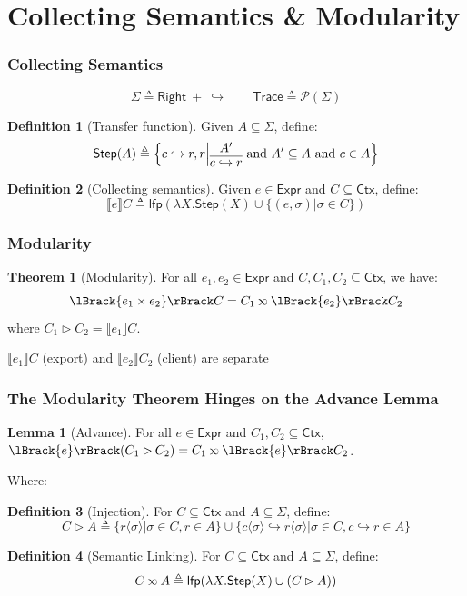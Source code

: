 \documentclass{beamer}
\theoremstyle{definition}
\newtheorem*{definition*}{Definition}
\newtheorem*{lemma*}{Lemma}
\newtheorem*{theorem*}{Theorem}
\newcommand*{\pset}{\mathcal{P}}
\newcommand*{\Expr}{\mathsf{Expr}}
\newcommand*{\ctx}{\sigma}
\newcommand*{\Ctx}{\mathsf{Ctx}}
\newcommand*{\Trace}{\mathsf{Trace}}
\newcommand*{\config}{c}
\newcommand*{\Right}{\mathsf{Right}}
\newcommand*{\rightst}{r}
\newcommand*{\lfp}{\mathsf{lfp}}
\newcommand*{\Step}{\mathsf{Step}}
\newcommand*{\semarrow}{\hookrightarrow}
\newcommand*{\semlink}{\mathbin{\rotatebox[origin=c]{180}{$\propto$}}}
\newcommand*{\link}[2]{{#1}\rtimes{#2}}
\newcommand*{\sembracket}[1]{\lBrack{#1}\rBrack}
\newcommand*{\inject}[2]{{#2}\langle{#1}\rangle}
\begin{document}
\section{Collecting Semantics \& Modularity}
\begin{frame}[c]
  \frametitle{Collecting Semantics}
  \[\Sigma\triangleq\Right\:+\:\semarrow\qquad\Trace\triangleq\pset(\Sigma)\]
  \begin{definition*}[Transfer function]
    Given $A\subseteq\Sigma$, define:
    \[
      \mathsf{Step}(A)\triangleq
      \left\{\config\semarrow\rightst, \rightst\middle|
      \begin{prooftree}[center=true]
        \hypo{A'}\infer1{\config\semarrow\rightst}
      \end{prooftree}\text{ and }
      A'\subseteq A\text{ and }\config\in A
      \right\}
    \]
  \end{definition*}
  \begin{definition*}[Collecting semantics]
    Given $e\in\Expr$ and $C\subseteq\Ctx$, define:
    \[
      \sembracket{e}C\triangleq\lfp(\lambda X.\mathsf{Step}(X)\cup\{(e,\ctx)|\ctx\in C\})
    \]
  \end{definition*}
\end{frame}
\begin{frame}[c]
  \frametitle{Modularity}
  \begin{theorem*}[Modularity]
    For all $e_1,e_2\in\Expr$ and $C,C_1,C_2\subseteq\Ctx$, we have:
    \[\sembracket{\link{e_1}{e_2}}C=C_1\semlink\sembracket{e_2}C_2\]
    where $C_1\rhd C_2=\sembracket{e_1}C$.
  \end{theorem*}
  $\sembracket{e_1}C$ (export) and $\sembracket{e_2}C_2$ (client) are separate
\end{frame}
\begin{frame}[c]
  \frametitle{The Modularity Theorem Hinges on the Advance Lemma}
  \begin{lemma*}[Advance]
    For all $e\in\Expr$ and $C_1,C_2\subseteq\Ctx$, $\sembracket{e}(C_1\rhd C_2)=C_1\semlink\sembracket{e}C_2$.
  \end{lemma*}
  Where:
  \begin{definition*}[Injection]
    For $C\subseteq\Ctx$ and $A\subseteq\Sigma$, define:
    \[C\rhd A\triangleq\{\inject{\ctx}{\rightst}|\ctx\in C,\rightst\in A\}\cup\{\inject{\ctx}{\config}\semarrow\inject{\ctx}{\rightst}|\ctx\in C,\config\semarrow\rightst\in A\}\]
  \end{definition*}
  \begin{definition*}[Semantic Linking]
    For $C\subseteq\Ctx$ and $A\subseteq \Sigma$, define:
    \[C\semlink A\triangleq\lfp(\lambda X.\Step(X)\cup(C\rhd A))\]
  \end{definition*}
\end{frame}
\end{document}
